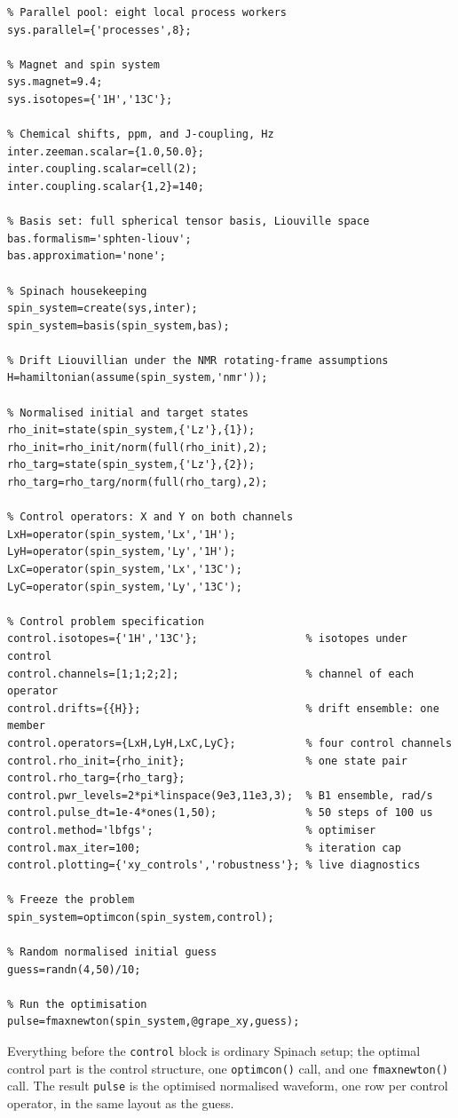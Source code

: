 \documentclass[11pt,a4paper]{article}
\newcommand{\code}[1]{\texttt{#1}}
\begin{document}
\begin{lstlisting}
% Parallel pool: eight local process workers
sys.parallel={'processes',8};

% Magnet and spin system
sys.magnet=9.4;
sys.isotopes={'1H','13C'};

% Chemical shifts, ppm, and J-coupling, Hz
inter.zeeman.scalar={1.0,50.0};
inter.coupling.scalar=cell(2);
inter.coupling.scalar{1,2}=140;

% Basis set: full spherical tensor basis, Liouville space
bas.formalism='sphten-liouv';
bas.approximation='none';

% Spinach housekeeping
spin_system=create(sys,inter);
spin_system=basis(spin_system,bas);

% Drift Liouvillian under the NMR rotating-frame assumptions
H=hamiltonian(assume(spin_system,'nmr'));

% Normalised initial and target states
rho_init=state(spin_system,{'Lz'},{1});
rho_init=rho_init/norm(full(rho_init),2);
rho_targ=state(spin_system,{'Lz'},{2});
rho_targ=rho_targ/norm(full(rho_targ),2);

% Control operators: X and Y on both channels
LxH=operator(spin_system,'Lx','1H');
LyH=operator(spin_system,'Ly','1H');
LxC=operator(spin_system,'Lx','13C');
LyC=operator(spin_system,'Ly','13C');

% Control problem specification
control.isotopes={'1H','13C'};                 % isotopes under control
control.channels=[1;1;2;2];                    % channel of each operator
control.drifts={{H}};                          % drift ensemble: one member
control.operators={LxH,LyH,LxC,LyC};           % four control channels
control.rho_init={rho_init};                   % one state pair
control.rho_targ={rho_targ};
control.pwr_levels=2*pi*linspace(9e3,11e3,3);  % B1 ensemble, rad/s
control.pulse_dt=1e-4*ones(1,50);              % 50 steps of 100 us
control.method='lbfgs';                        % optimiser
control.max_iter=100;                          % iteration cap
control.plotting={'xy_controls','robustness'}; % live diagnostics

% Freeze the problem
spin_system=optimcon(spin_system,control);

% Random normalised initial guess
guess=randn(4,50)/10;

% Run the optimisation
pulse=fmaxnewton(spin_system,@grape_xy,guess);
\end{lstlisting}

Everything before the \code{control} block is ordinary Spinach setup; the
optimal control part is the control structure, one \code{optimcon()}
call, and one \code{fmaxnewton()} call. The result \code{pulse} is the
optimised normalised waveform, one row per control operator, in the same
layout as the guess.
\end{document}
